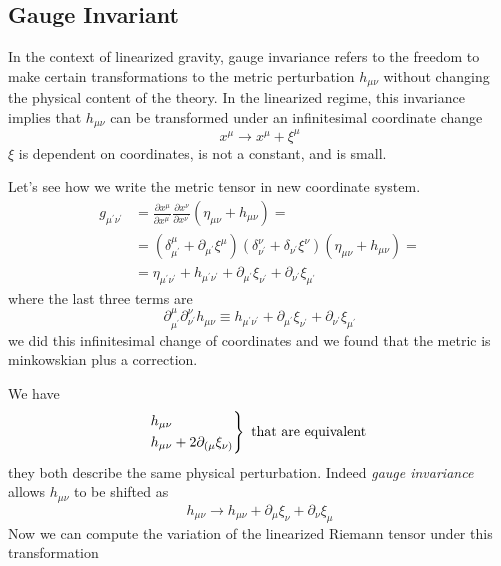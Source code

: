 \subsection{Gauge Invariant}
In the context of linearized gravity, gauge invariance refers to the freedom to make certain transformations to the metric perturbation $h_{\mu \nu }$ without changing the physical content of the theory. In the linearized regime, this invariance implies that $h_{\mu \nu }$ can be transformed under an infinitesimal coordinate change
\[
x^{\mu } \to x^{\mu }+ \xi^{\mu }  
\]
$\xi $ is dependent on coordinates, is not a constant, and is small.\par
Let's see how we write the metric tensor in new coordinate system.
\begin{align}
	g_{\mu ^{\prime }\nu ^{\prime }} &= \frac{\partial x^{\mu }}{\partial x^{\mu ^{\prime }}} \frac{\partial x^{\nu }}{\partial x^{\nu ^{\prime }}} \left( \eta _{\mu \nu } +h_{\mu \nu } \right) = \nonumber\\
	 &= \left( \delta ^{\mu }_{\mu ^{\prime }} + \partial_{\mu ^{\prime }}\xi ^{\mu } \right) \left( \delta^{\nu }_{\nu ^{\prime }} + \delta_{\nu ^{\prime }} \xi ^{\nu } \right) \left( \eta _{\mu \nu }+h_{\mu \nu } \right) = \nonumber\\
	&= \eta _{\mu ^{\prime }\nu ^{\prime }} + h_{\mu ^{\prime }\nu ^{\prime }} +\partial_{\mu ^{\prime }}\xi _{\nu ^{\prime }}+\partial_{\nu ^{\prime }}\xi _{\mu ^{\prime }}
\end{align}
where the last three terms are
\begin{equation}
\partial^{\mu }_{\mu ^{\prime }}\partial^{\nu }_{\nu ^{\prime }}h_{\mu \nu } \equiv   h_{\mu ^{\prime }\nu ^{\prime }} +\partial_{\mu ^{\prime }}\xi _{\nu ^{\prime }}+\partial_{\nu ^{\prime }}\xi _{\mu ^{\prime }}
\end{equation}
we did this infinitesimal change of coordinates and we found that the metric is minkowskian plus a correction.\par
We have
\[
\begin{rcases*}
h_{\mu \nu }\\
h_{\mu \nu }+ 2\partial_{(\mu  }\xi _{\nu )}
\end{rcases*}
\text{ that are equivalent }
\]
they both describe the same physical perturbation. Indeed \emph{gauge invariance} allows $h_{\mu \nu } $ to be shifted as
\[
h_{\mu \nu }\to h_{\mu \nu }+\partial_{\mu }\xi _{\nu }+\partial_{\nu }\xi _{\mu }
\]
Now we can compute the variation of the linearized Riemann tensor under this transformation
